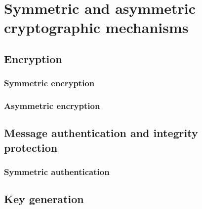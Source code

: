 \chapter{Symmetric and asymmetric cryptographic mechanisms}
\section{Encryption}
\subsection{Symmetric encryption}
\subsection{Asymmetric encryption}
\section{Message authentication and integrity protection}
\subsection{Symmetric authentication}
\subsection{}
\section{Key generation}
